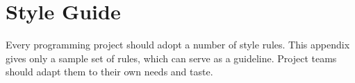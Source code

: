 %
% 
% 
% 
% 

\chapter{Style Guide}
\label{styleguide}

Every {\eclipse} programming project should adopt a number of style rules.
This appendix gives only a sample set of rules, which can serve as a guideline.
Project teams should adapt them to their own needs and taste.

